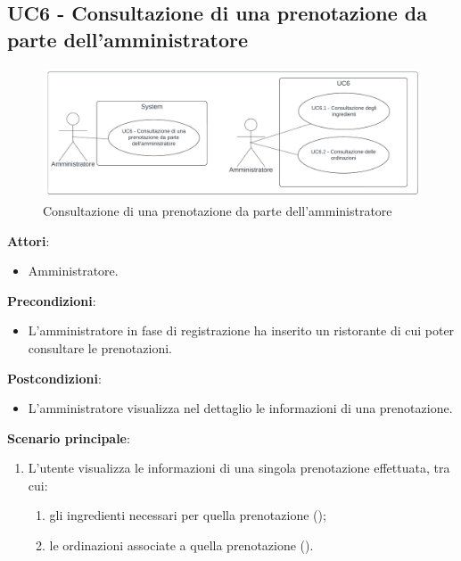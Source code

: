 \subsection{UC6 - Consultazione di una prenotazione da parte dell'amministratore}\label{usecase:6}
\begin{figure}[H]
  \centering
  \includegraphics[width=1\textwidth]{ucd/UCD6_new.png}
\caption{Consultazione di una prenotazione da parte dell'amministratore}
\end{figure}
\textbf{Attori}:
\begin{itemize}
    \item Amministratore.
\end{itemize}
\textbf{Precondizioni}:
\begin{itemize}
    \item L'amministratore in fase di registrazione ha inserito un ristorante di cui poter consultare le prenotazioni.
\end{itemize}
\textbf{Postcondizioni}:
\begin{itemize}
    \item L'amministratore visualizza nel dettaglio le informazioni di una prenotazione.
\end{itemize}
\textbf{Scenario principale}:
\begin{enumerate}
    \item L'utente visualizza le informazioni di una singola prenotazione effettuata, tra cui:
    \begin{enumerate}
        \item gli ingredienti necessari per quella prenotazione ();
        \item le ordinazioni associate a quella prenotazione
        ().
    \end{enumerate}
\end{enumerate}